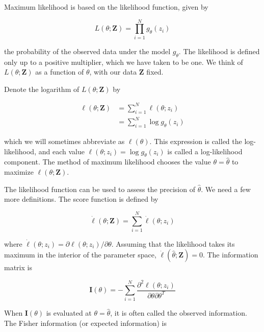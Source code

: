\documentclass[10pt]{article}
\begin{document}
Maximum likelihood is based on the likelihood function, given by


\begin{equation*}
L(\theta ; \mathbf{Z})=\prod_{i=1}^{N} g_{\theta}\left(z_{i}\right) \tag{8.11}
\end{equation*}


the probability of the observed data under the model $g_{\theta}$. The likelihood is defined only up to a positive multiplier, which we have taken to be one. We think of $L(\theta ; \mathbf{Z})$ as a function of $\theta$, with our data $\mathbf{Z}$ fixed.

Denote the logarithm of $L(\theta ; \mathbf{Z})$ by


\begin{align*}
\ell(\theta ; \mathbf{Z}) & =\sum_{i=1}^{N} \ell\left(\theta ; z_{i}\right) \\
& =\sum_{i=1}^{N} \log g_{\theta}\left(z_{i}\right) \tag{8.12}
\end{align*}


which we will sometimes abbreviate as $\ell(\theta)$. This expression is called the log-likelihood, and each value $\ell\left(\theta ; z_{i}\right)=\log g_{\theta}\left(z_{i}\right)$ is called a log-likelihood component. The method of maximum likelihood chooses the value $\theta=\hat{\theta}$ to maximize $\ell(\theta ; \mathbf{Z})$.

The likelihood function can be used to assess the precision of $\hat{\theta}$. We need a few more definitions. The score function is defined by


\begin{equation*}
\dot{\ell}(\theta ; \mathbf{Z})=\sum_{i=1}^{N} \dot{\ell}\left(\theta ; z_{i}\right) \tag{8.13}
\end{equation*}


where $\dot{\ell}\left(\theta ; z_{i}\right)=\partial \ell\left(\theta ; z_{i}\right) / \partial \theta$. Assuming that the likelihood takes its maximum in the interior of the parameter space, $\dot{\ell}(\hat{\theta} ; \mathbf{Z})=0$. The information matrix is


\begin{equation*}
\mathbf{I}(\theta)=-\sum_{i=1}^{N} \frac{\partial^{2} \ell\left(\theta ; z_{i}\right)}{\partial \theta \partial \theta^{T}} \tag{8.14}
\end{equation*}


When $\mathbf{I}(\theta)$ is evaluated at $\theta=\hat{\theta}$, it is often called the observed information. The Fisher information (or expected information) is
\end{document}
